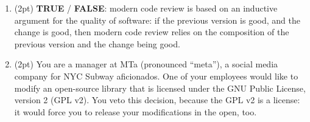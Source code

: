 \documentclass{report}
\newif\ifkey
\newcommand{\correct}[1]{\ifkey\color{red}\textbf{#1}\color{black}\else\textbf{#1}\fi\xspace}
\newcommand{\answershort}[1]{\ifkey\color{red}\underline{\textbf{#1}}\color{black}\else\underline{\hspace{3in}}\fi\xspace}
\newcommand*{\pts}[1]{\addtocounter{points}{#1}(#1pt)}
\begin{document}
\begin{spacing}{1.4}
\begin{enumerate}[leftmargin=*]


   \item \pts{2} \correct{TRUE} / \textbf{FALSE}: modern code review is based on an inductive argument for the quality of
     software: if the previous version is good, and the change is good, then modern code review relies on the composition
     of the previous version and the change being good.

   \item \pts{2} You are a manager at MTa (pronounced ``meta''), a social media company for NYC Subway aficionados. One of your
     employees would like to modify an open-source library that is licensed under the GNU Public License, version 2 (GPL v2). You veto
     this decision, because the GPL v2 is a \answershort{copyleft} license: it would force you to release your modifications in
     the open, too.


\end{enumerate}
\end{spacing}
\end{document}

